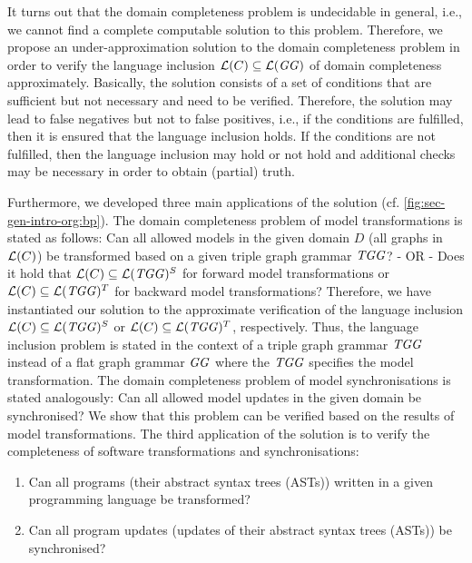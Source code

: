 It turns out that the domain completeness problem is undecidable in general, i.e., we cannot find a complete computable solution to this problem.
Therefore, we propose an under-approximation solution to the domain completeness problem in order to verify the language inclusion $\mathcal{L}(C) \subseteq \mathcal{L}(\mathit{GG})$ of domain completeness approximately.
Basically, the solution consists of a set of conditions that are sufficient but not necessary and need to be verified.
Therefore, the solution may lead to false negatives but not to false positives, i.e., if the conditions are fulfilled, then it is ensured that the language inclusion holds. 
If the conditions are not fulfilled, then the language inclusion may hold or not hold and additional checks may be necessary in order to obtain (partial) truth.

Furthermore, we developed three main applications of the solution (cf. \cref{fig:sec-gen-intro-org:bp}).
The domain completeness problem of model transformations is stated as follows: Can all allowed models in the given domain $D$ (all graphs in $\mathcal{L}(C)$) be transformed based on a given triple graph grammar $\mathit{TGG}$? - OR - Does it hold that $\mathcal{L}(C) \subseteq \mathcal{L}(\mathit{TGG})^S$ for forward model transformations or $\mathcal{L}(C) \subseteq \mathcal{L}(\mathit{TGG})^T$ for backward model transformations?
Therefore, we have instantiated our solution to the approximate verification of the language inclusion $\mathcal{L}(C) \subseteq \mathcal{L}(\mathit{TGG})^S$ or $\mathcal{L}(C) \subseteq \mathcal{L}(\mathit{TGG})^T$, respectively.
Thus, the language inclusion problem is stated in the context of a triple graph grammar $\mathit{TGG}$ \cite{DBLP:journals/eceasst/AnjorinLS15,DBLP:conf/gg/SchurrK08,DBLP:conf/wg/Schurr94} instead of a flat graph grammar $\mathit{GG}$ where the $\mathit{TGG}$ specifies the model transformation.
The domain completeness problem of model synchronisations is stated analogously: Can all allowed model updates in the given domain be synchronised?
We show that this problem can be verified based on the results of model transformations.
The third application of the solution is to verify the completeness of software transformations and synchronisations: 
\begin{enumerate}
  \item Can all programs (their abstract syntax trees (ASTs)) written in a given programming language be transformed? 
  \item Can all program updates (updates of their abstract syntax trees (ASTs)) be synchronised?
\end{enumerate}
